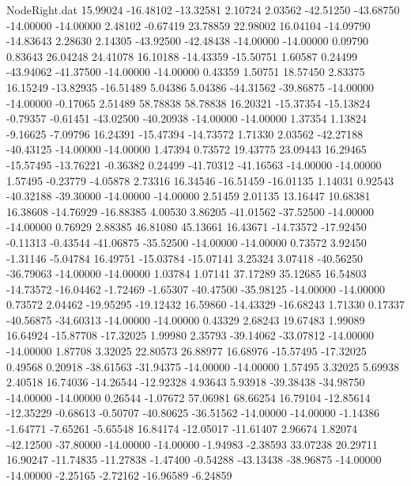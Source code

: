 \begin{filecontents}{NodeRight.dat}
  15.99024  -16.48102  -13.32581     2.10724    2.03562  -42.51250  -43.68750  -14.00000  -14.00000    2.48102   -0.67419   23.78859   22.98002
  16.04104  -14.09790  -14.83643     2.28630    2.14305  -43.92500  -42.48438  -14.00000  -14.00000    0.09790    0.83643   26.04248   24.41078
  16.10188  -14.43359  -15.50751     1.60587    0.24499  -43.94062  -41.37500  -14.00000  -14.00000    0.43359    1.50751   18.57450    2.83375
  16.15249  -13.82935  -16.51489     5.04386    5.04386  -44.31562  -39.86875  -14.00000  -14.00000   -0.17065    2.51489   58.78838   58.78838
  16.20321  -15.37354  -15.13824    -0.79357   -0.61451  -43.02500  -40.20938  -14.00000  -14.00000    1.37354    1.13824   -9.16625   -7.09796
  16.24391  -15.47394  -14.73572     1.71330    2.03562  -42.27188  -40.43125  -14.00000  -14.00000    1.47394    0.73572   19.43775   23.09443
  16.29465  -15.57495  -13.76221    -0.36382    0.24499  -41.70312  -41.16563  -14.00000  -14.00000    1.57495   -0.23779   -4.05878    2.73316
  16.34546  -16.51459  -16.01135     1.14031    0.92543  -40.32188  -39.30000  -14.00000  -14.00000    2.51459    2.01135   13.16447   10.68381
  16.38608  -14.76929  -16.88385     4.00530    3.86205  -41.01562  -37.52500  -14.00000  -14.00000    0.76929    2.88385   46.81080   45.13661
  16.43671  -14.73572  -17.92450    -0.11313   -0.43544  -41.06875  -35.52500  -14.00000  -14.00000    0.73572    3.92450   -1.31146   -5.04784
  16.49751  -15.03784  -15.07141     3.25324    3.07418  -40.56250  -36.79063  -14.00000  -14.00000    1.03784    1.07141   37.17289   35.12685
  16.54803  -14.73572  -16.04462    -1.72469   -1.65307  -40.47500  -35.98125  -14.00000  -14.00000    0.73572    2.04462  -19.95295  -19.12432
  16.59860  -14.43329  -16.68243     1.71330    0.17337  -40.56875  -34.60313  -14.00000  -14.00000    0.43329    2.68243   19.67483    1.99089
  16.64924  -15.87708  -17.32025     1.99980    2.35793  -39.14062  -33.07812  -14.00000  -14.00000    1.87708    3.32025   22.80573   26.88977
  16.68976  -15.57495  -17.32025     0.49568    0.20918  -38.61563  -31.94375  -14.00000  -14.00000    1.57495    3.32025    5.69938    2.40518
  16.74036  -14.26544  -12.92328     4.93643    5.93918  -39.38438  -34.98750  -14.00000  -14.00000    0.26544   -1.07672   57.06981   68.66254
  16.79104  -12.85614  -12.35229    -0.68613   -0.50707  -40.80625  -36.51562  -14.00000  -14.00000   -1.14386   -1.64771   -7.65261   -5.65548
  16.84174  -12.05017  -11.61407     2.96674    1.82074  -42.12500  -37.80000  -14.00000  -14.00000   -1.94983   -2.38593   33.07238   20.29711
  16.90247  -11.74835  -11.27838    -1.47400   -0.54288  -43.13438  -38.96875  -14.00000  -14.00000   -2.25165   -2.72162  -16.96589   -6.24859

\end{filecontents}
